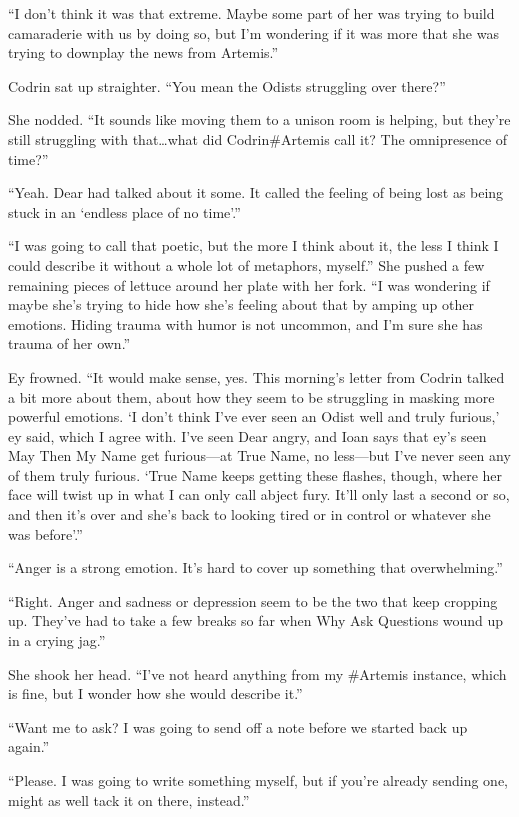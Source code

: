 ``I don't think it was that extreme. Maybe some part of her was trying to build camaraderie with us by doing so, but I'm wondering if it was more that she was trying to downplay the news from Artemis.''

Codrin sat up straighter. ``You mean the Odists struggling over there?''

She nodded. ``It sounds like moving them to a unison room is helping, but they're still struggling with that\ldots what did Codrin\#Artemis call it? The omnipresence of time?''

``Yeah. Dear had talked about it some. It called the feeling of being lost as being stuck in an `endless place of no time'.''

``I was going to call that poetic, but the more I think about it, the less I think I could describe it without a whole lot of metaphors, myself.'' She pushed a few remaining pieces of lettuce around her plate with her fork. ``I was wondering if maybe she's trying to hide how she's feeling about that by amping up other emotions. Hiding trauma with humor is not uncommon, and I'm sure she has trauma of her own.''

Ey frowned. ``It would make sense, yes. This morning's letter from Codrin talked a bit more about them, about how they seem to be struggling in masking more powerful emotions. `I don't think I've ever seen an Odist well and truly furious,' ey said, which I agree with. I've seen Dear angry, and Ioan says that ey's seen May Then My Name get furious—at True Name, no less—but I've never seen any of them truly furious. `True Name keeps getting these flashes, though, where her face will twist up in what I can only call abject fury. It'll only last a second or so, and then it's over and she's back to looking tired or in control or whatever she was before'.''

``Anger is a strong emotion. It's hard to cover up something that overwhelming.''

``Right. Anger and sadness or depression seem to be the two that keep cropping up. They've had to take a few breaks so far when Why Ask Questions wound up in a crying jag.''

She shook her head. ``I've not heard anything from my \#Artemis instance, which is fine, but I wonder how she would describe it.''

``Want me to ask? I was going to send off a note before we started back up again.''

``Please. I was going to write something myself, but if you're already sending one, might as well tack it on there, instead.''

